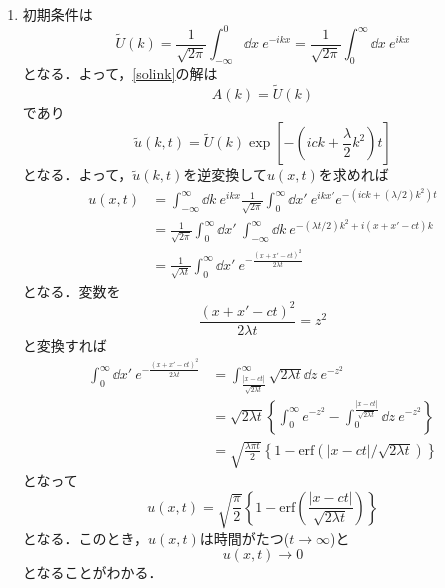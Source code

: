 \documentclass[a4paper,pdflatex,ja=standard]{bxjsarticle}
\begin{document}
\begin{enumerate}
\begin{enumerate}
    \item 
    初期条件は
    \begin{equation}
      \tilde{U}(k)
      =
      \frac{1}{\sqrt{2\pi}}\int_{-\infty}^{0}\dd x\ e^{-ikx}
      =
      \frac{1}{\sqrt{2\pi}}\int_{0}^{\infty}\dd x\ e^{ikx}
    \end{equation}
    となる．よって，\eqref{solink}の解は
    \begin{equation}
      A(k)
      =
      \tilde{U}(k)
    \end{equation}
    であり
    \begin{equation}
      \tilde{u}(k,t)
      =
      \tilde{U}(k)
      \exp\left[ -\left( ick+\frac{\lambda}{2}k^2 \right)t \right]
    \end{equation}
    となる．よって，$\tilde{u}(k,t)$を逆変換して$u(x,t)$を求めれば
    \begin{align}
      u(x,t)
      &=
      \int_{-\infty}^{\infty}\dd k\ e^{ikx}
      \frac{1}{\sqrt{2\pi}}\int_{0}^{\infty}\dd x'\ e^{ikx'}
      e^{-\left( ick+(\lambda/2)k^2 \right)t}
      \nonumber
      \\
      &=
      \frac{1}{\sqrt{2\pi}}
      \int_{0}^{\infty}\dd x'\ \int_{-\infty}^{\infty}\dd k\ 
      e^{-(\lambda t/2)k^2+i(x+x'-ct)k}
      \nonumber
      \\
      &=
      \frac{1}{\sqrt{\lambda t}}\int_{0}^{\infty}\dd x'\ e^{-\tfrac{(x+x'-ct)^2}{2\lambda t}}
    \end{align}
    となる．変数を
    \begin{equation}
      \frac{(x+x'-ct)^2}{2\lambda t}
      =
      z^2
    \end{equation}
    と変換すれば
    \begin{align}
      \int_{0}^{\infty}\dd x'\ e^{-\tfrac{(x+x'-ct)^2}{2\lambda t}}
      &=
      \int_{\tfrac{|x-ct|}{\sqrt{2\lambda t}}}^{\infty}\sqrt{2\lambda t}\dd z\ e^{-z^2}
      \nonumber
      \\
      &=
      \sqrt{2\lambda t}\left\{ 
      \int_{0}^{\infty}e^{-z^2}-\int_{0}^{\tfrac{|x-ct|}{\sqrt{2\lambda t}}}\dd z\ e^{-z^2}
      \right\}
      \nonumber
      \\
      &=
      \sqrt{\frac{\lambda\pi t}{2}}\left\{ 1-\text{erf}(|x-ct|/\sqrt{2\lambda t}) \right\}
    \end{align}
    となって
    \begin{equation}
      u(x,t)
      =
      \sqrt{\frac{\pi}{2}}\left\{ 1-\text{erf}\left( \frac{|x-ct|}{\sqrt{2\lambda t}} \right) \right\}
    \end{equation}
    となる．このとき，$u(x,t)$は時間がたつ($t\rightarrow\infty$)と
    \begin{equation}
      u(x,t)
      \rightarrow
      0
    \end{equation}
    となることがわかる．
  \end{enumerate}
\end{enumerate}
\end{document}
